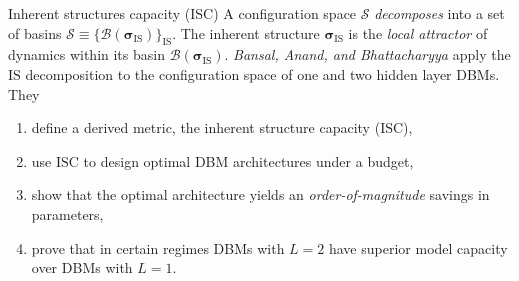 \documentclass[8pt]{beamer}
\begin{document}
\begin{frame}[label={sec:orgf480467}]{Inherent structures capacity (ISC)}
A configuration space \(\mathcal{S}\) \emph{decomposes} into a set of basins \(\mathcal{S} \equiv \{\mathcal{B}(\boldsymbol{\sigma}_{\mathrm{IS}})\}_{\boldsymbol{\mathrm{IS}}}\). The inherent structure \(\boldsymbol{\sigma}_{\text{IS}}\) is the \emph{local attractor} of dynamics within its basin \(\mathcal{B}(\boldsymbol{\sigma}_{\mathrm{IS}})\).
\linebreak \linebreak
\emph{Bansal, Anand, and Bhattacharyya} \cite{bansal2018using} apply the \(\mathrm{IS}\) decomposition to the configuration space of one and two hidden layer DBMs. They
\linebreak
\begin{enumerate}
\item define a derived metric, the \alert{inherent structure capacity} (\(\mathrm{ISC}\)),
\linebreak
\item use \(\mathrm{ISC}\) to design optimal DBM architectures under a budget,
\linebreak
\item show that the optimal architecture yields an \emph{order-of-magnitude} savings in parameters,
\linebreak
\item prove that in certain regimes DBMs with \(L = 2\) have superior model capacity over DBMs with \(L = 1\).
\end{enumerate}
\end{frame}
\end{document}
